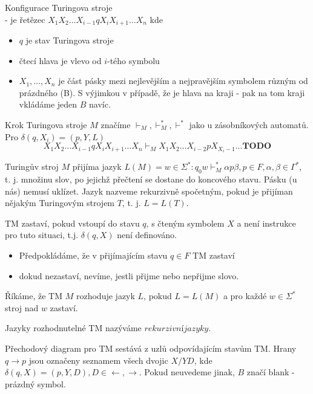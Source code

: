 \documentclass[../main.tex]{subfiles}
\begin{document}
\begin{definition}
    Konfigurace Turingova stroje\\

    - je řetězec $X_1X_2\dots X_{i-1}qX_i X_{i+1}\dots X_n$ kde
    \begin{itemize}
        \item $q$ je stav Turingova stroje
        \item čtecí hlava je vlevo od $i$-tého symbolu
        \item $X_1,\dots,X_n$ je část pásky mezi nejlevějším a nejpravějším symbolem různým od prázdného (B). S výjimkou v případě,
        že je hlava na kraji - pak na tom kraji vkládáme jeden $B$ navíc.
    \end{itemize}
\end{definition}
\begin{definition}
    Krok Turingova stroje $M$ značíme $\vdash_M, \vdash^*_M, \vdash^*$ jako u zásobníkových automatů.
    Pro $\delta(q,X_i) = (p,Y,L)$
    \[X_1X_2\dots X_{i-1}q X_i X_{i+1}\dots X_n \vdash_M X_1 X_2 \dots X_{i-2}pX_{X_i-1} ... \textbf{TODO}\]
\end{definition}
\begin{definition}
    Turingův stroj $M$ přijíma jazyk $L(M) = {w \in \Sigma^*: q_0 w \vdash^*_M \alpha p \beta, p \in F, \alpha, \beta \in \Gamma^*}$, t. j. množinu slov, po jejichž přečtení se dostane do koncového stavu. Pásku (u nás) nemusí uklízet.
    Jazyk nazveme rekurzivně spočetným, pokud je přijíman nějakým Turingovým strojem $T$, t. j. $L = L(T)$. 
\end{definition}
\begin{definition}
    TM zastaví, pokud vstoupí do stavu $q$, s čteným symbolem $X$ a není instrukce pro tuto situaci, t.j. $\delta(q,X)$ není definováno.
\end{definition}
\begin{itemize}
    \item Předpokládáme, že v přijímajícím stavu $q \in F$ TM zastaví
    \item dokud nezastaví, nevíme, jestli přijme nebo nepřijme slovo.
\end{itemize}
\begin{definition}
    Říkáme, že TM $M$ rozhoduje jazyk $L$, pokud $L = L(M)$ a pro každé $w\in \Sigma^*$ stroj nad $w$ zastaví.

    Jazyky rozhodnutelné TM nazýváme $rekurzivní jazyky$.
\end{definition}
\begin{definition}
    Přechodový diagram pro TM sestává z uzlů odpovídajícím stavům TM. Hrany $q \rightarrow p$ jsou označeny seznamem všech dvojic $X/YD$, kde 
    $\delta(q,X) = (p,Y,D), D \in {\leftarrow, \rightarrow}$.
    Pokud neuvedeme jinak, $B$ značí blank - prázdný symbol.
\end{definition}
\end{document}
